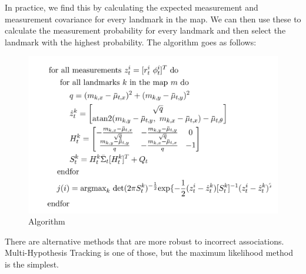 \documentclass[twoside]{article}
\begin{document}
In practice, we find this by calculating the expected measurement and measurement covariance for every landmark in the map. We can then use these to calculate the measurement probability for every landmark and then select the landmark with the highest probability. The algorithm goes as follows:

\begin{figure}[H]
\centering
\includegraphics[width=0.7\columnwidth]{algorithm_fig1}
\caption{Algorithm}
\end{figure}

There are alternative methods that are more robust to incorrect associations. Multi-Hypothesis Tracking is one of those, but the maximum likelihood method is the simplest.
\end{document}
